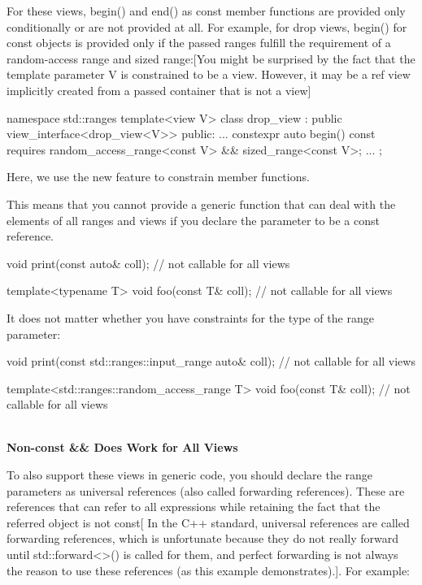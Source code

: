 For these views, begin() and end() as const member functions are provided only conditionally or are not provided at all. For example, for drop views, begin() for const objects is provided only if the passed ranges fulfill the requirement of a random-access range and sized range:[You might be surprised by the fact that the template parameter V is constrained to be a view. However, it may be a ref view implicitly created from a passed container that is not a view]


\begin{cpp}
namespace std::ranges {
	template<view V>
	class drop_view : public view_interface<drop_view<V>> {
		public:
		...
		constexpr auto begin() const requires random_access_range<const V>
		&& sized_range<const V>;
		...
	};
}
\end{cpp}

Here, we use the new feature to constrain member functions.

This means that you cannot provide a generic function that can deal with the elements of all ranges and views if you declare the parameter to be a const reference.

\begin{cpp}
void print(const auto& coll); // not callable for all views

template<typename T>
void foo(const T& coll); // not callable for all views
\end{cpp}

It does not matter whether you have constraints for the type of the range parameter:

\begin{cpp}
void print(const std::ranges::input_range auto& coll); // not callable for all views

template<std::ranges::random_access_range T>
void foo(const T& coll); // not callable for all views
\end{cpp}


\noindent
\hspace*{\fill} \\ %
\textbf{Non-const \&\& Does Work for All Views}

To also support these views in generic code, you should declare the range parameters as universal references (also called forwarding references). These are references that can refer to all expressions while retaining the fact that the referred object is not const[ In the C++ standard, universal references are called forwarding references, which is unfortunate because they do not really forward until std::forward<>() is called for them, and perfect forwarding is not always the reason to use these references (as this example demonstrates).]. For example:

